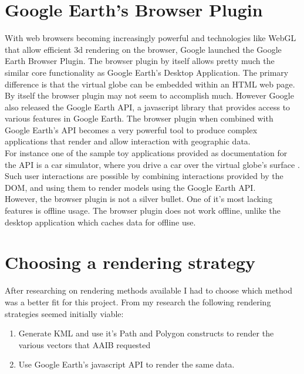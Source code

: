 \section{Google Earth's Browser Plugin}

With web browsers becoming increasingly powerful and technologies like WebGL that allow efficient 3d rendering on the browser, Google launched the Google Earth Browser Plugin\citep{google:browser-plugin}. The browser plugin by itself allows pretty much the similar core functionality as Google Earth's Desktop Application. The primary difference is that the virtual globe can be embedded within an HTML web page.\\

By itself the browser plugin may not seem to accomplish much. However Google also released the Google Earth
API, a javascript library that provides access to various features in Google Earth. The browser plugin when combined with Google Earth's API becomes a very powerful tool to produce complex applications that render and allow interaction with geographic data. \\

For instance one of the sample toy applications provided as documentation for the API is a car simulator,
where you drive a car over the virtual globe's surface \citep{google:earth-api}. \\

Such user interactions are possible by combining interactions provided by the DOM, and using them to render models using the Google Earth API. \\

However, the browser plugin is not a silver bullet. One of it's most lacking features is offline usage. The browser plugin does not work offline, unlike the desktop application which caches data for offline use.


\section{Choosing a rendering strategy}

After researching on rendering methods available I had to choose which method was a better fit for this project. From my research the following rendering strategies seemed initially viable:

\begin{enumerate}
\item Generate KML and use it's Path and Polygon constructs to render the various vectors that AAIB requested
\item Use Google Earth's javascript API to render the same data.
\end{enumerate}

